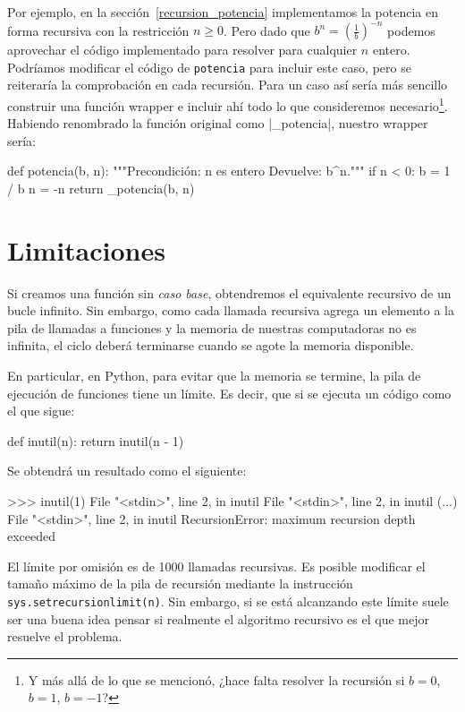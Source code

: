 Por ejemplo, en la sección~\ref{recursion_potencia} implementamos la potencia
en forma recursiva con la restricción $n \geq 0$. Pero dado que
$b^n = \left(\frac1b\right)^{-n}$ podemos aprovechar el código implementado para
resolver para cualquier $n$ entero. Podríamos modificar el código de \lstinline!potencia! para
incluir este caso, pero se reiteraría la comprobación en cada recursión.
Para un caso así sería más sencillo construir una función wrapper
e incluir ahí todo lo que consideremos necesario\footnote{Y más allá de lo
que se mencionó, ¿hace falta resolver la recursión si $b=0$, $b=1$, $b=-1$?}.
Habiendo renombrado la función original como |_potencia|, nuestro wrapper sería:
\begin{codigo-python-sn}
def potencia(b, n):
    """Precondición: n es entero
       Devuelve: b^n."""
    if n < 0:
        b = 1 / b
        n = -n
    return _potencia(b, n)
\end{codigo-python-sn}

\section{Limitaciones}

Si creamos una función sin \emph{caso base}, obtendremos el equivalente
recursivo de un bucle infinito.  Sin embargo, como cada llamada recursiva
agrega un elemento a la pila de llamadas a funciones y la memoria de
nuestras computadoras no es infinita, el ciclo deberá terminarse cuando se
agote la memoria disponible.

En particular, en Python, para evitar que la memoria se termine, la pila de
ejecución de funciones tiene un límite. Es decir, que si se ejecuta un
código como el que sigue:

\begin{codigo-python-sn}
def inutil(n):
    return inutil(n - 1)
\end{codigo-python-sn}

Se obtendrá un resultado como el siguiente:

\begin{codigo-python-sn}
>>> inutil(1)
  File "<stdin>", line 2, in inutil
  File "<stdin>", line 2, in inutil
  (...)
  File "<stdin>", line 2, in inutil
RecursionError: maximum recursion depth exceeded
\end{codigo-python-sn}

El límite por omisión es de 1000 llamadas recursivas. Es posible modificar
el tamaño máximo de la pila de recursión mediante la instrucción
\lstinline!sys.setrecursionlimit(n)!.  Sin embargo, si se está alcanzando
este límite suele ser una buena idea pensar si realmente el algoritmo
recursivo es el que mejor resuelve el problema.

